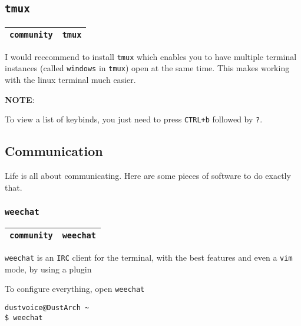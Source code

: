 \documentclass[9pt]{report}
\newcommand{\admonition}[2]{\textbf{#1}: {#2}}
\begin{document}
\vfill\eject

\hypertarget{x-tmux}{\subsection{\texttt{tmux}}}
\begin{center}
\begin{tabular}{|c|c|}
\hline
\texttt{community} & \texttt{tmux} \\ 
\hline
\end{tabular}
\end{center}

I would reccommend to install \texttt{tmux} which enables you to have multiple terminal instances (called \texttt{windows} in \texttt{tmux}) open at the same time.
This makes working with the linux terminal much easier.


\admonition{NOTE}{To view a list of keybinds, you just need to press \texttt{CTRL+b} followed by \texttt{?}.

}

\vfill\eject

\hypertarget{x-communication}{\subsection{Communication}}
Life is all about communicating.
Here are some pieces of software to do exactly that.



\vfill\eject

\hypertarget{x-weechat}{\subsubsection{\texttt{weechat}}}
\begin{center}
\begin{tabular}{|c|c|}
\hline
\texttt{community} & \texttt{weechat} \\ 
\hline
\end{tabular}
\end{center}

\texttt{weechat} is an \texttt{IRC} client for the terminal, with the best features and even a \texttt{vim} mode, by using a plugin


To configure everything, open \texttt{weechat}


\begin{verbatim}
dustvoice@DustArch ~
$ weechat
\end{verbatim}
\end{document}
